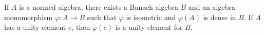 If $A$ is a normed algebra, there exists a Banach algebra $B$ and an algebra monomorphism $\varphi: A \to B$ such that $\varphi$ is isometric and $\varphi(A)$ is dense in $B$. If $A$ has a unity element $e$, then $\varphi(e)$ is a unity element for $B$.
